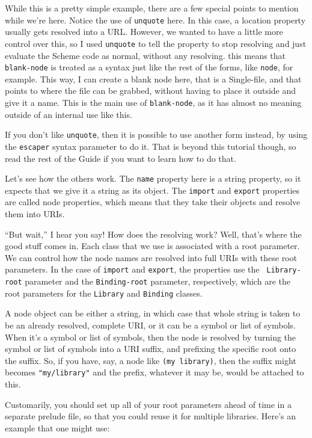 \noindent
While this is a pretty simple example, there are a few special points
to mention while we're here. Notice the use of {\tt unquote} here. In
this case, a location property usually gets resolved into a URL.
However, we wanted to have a little more control over this, so I used
{\tt unquote} to tell the property to stop resolving and just evaluate
the Scheme code as normal, without any resolving. this means that {\tt
blank-node} is treated as a syntax just like the rest of the forms,
like {\tt node}, for example. This way, I can create a blank node
here, that is a Single-file, and that points to where the file can be
grabbed, without having to place it outside and give it a name. This
is the main use of {\tt blank-node}, as it has almost no meaning
outside of an internal use like this.
 
If you don't like {\tt unquote}, then it is possible to use another
form instead, by using the {\tt escaper} syntax parameter to do it.
That is beyond this tutorial though, so read the rest of the Guide if
you want to learn how to do that. 
 
Let's see how the others work. The {\tt name} property here is a
string property, so it expects that we give it a string as its object.
The {\tt import} and {\tt export} properties are called node
properties, which means that they take their objects and resolve them
into URIs. 

``But wait,'' I hear you say! How does the resolving work? Well,
that's where the good stuff comes in. Each class that we use is
associated with a root parameter. We can control how the node names
are resolved into full URIs with these root parameters. In the case of
{\tt import} and {\tt export}, the properties use the {\tt
Library-root} parameter and the {\tt Binding-root} parameter,
respectively, which are the root parameters for the {\tt Library} and
{\tt Binding} classes. 
 
A node object can be either a string, in which case that whole string
is taken to be an already resolved, complete URI, or it can be a
symbol or list of symbols. When it's a symbol or list of symbols, then
the node is resolved by turning the symbol or list of symbols into a
URI suffix, and prefixing the specific root onto the suffix. So, if
you have, say, a node like {\tt (my library)}, then the suffix might
becomes {\tt "my/library"} and the prefix, whatever it may be, would be
attached to this. 
 
Customarily, you should set up all of your root parameters ahead of
time in a separate prelude file, so that you could reuse it for
multiple libraries. Here's an example that one might use:
 
